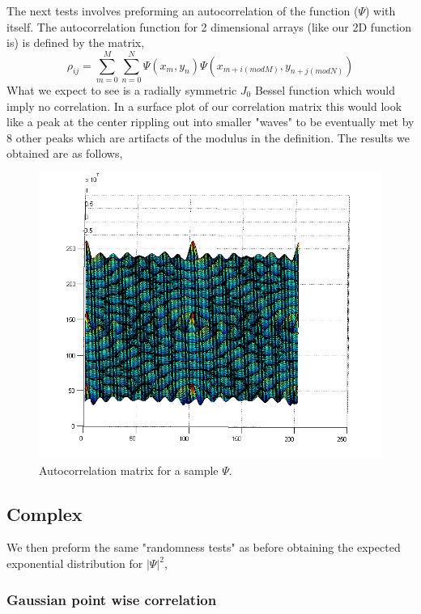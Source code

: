 \documentclass[12pt]{article}
\begin{document}
The next tests involves preforming an autocorrelation of the function ($\Psi$) with itself. The autocorrelation function for 2 dimensional arrays (like our 2D function is) is defined by the matrix,
\[\rho_{ij} = \sum_{m=0}^{M} \sum_{n=0}^{N} \Psi(x_{m},y_{n}) \Psi(x_{m+i (mod M)},y_{n+j (mod N)})\]
What we expect to see is a radially symmetric $J_{0}$ Bessel function which would imply no correlation. In a surface plot of our correlation matrix this would look like a peak at the center rippling out into smaller "waves" to be eventually met by 8 other peaks which are artifacts of the modulus in the definition. The results we obtained are as follows,

\begin{figure}[hpt]
	\centering
		\includegraphics[width=1.00\textwidth]{autocorr50by50wav1000.png}
	\caption{Autocorrelation matrix for a sample $\Psi$.}
	\label{fig:autocorr50by50wav1000}
\end{figure}

\pagebreak

\subsection{Complex}

We then preform the same "randomness tests" as before obtaining the expected exponential distribution for $|\Psi|^{2}$,

\subsubsection{Gaussian point wise correlation}
\end{document}
